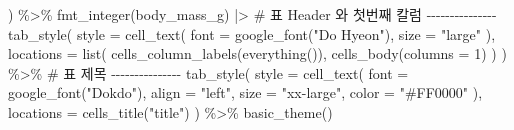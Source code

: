 \documentclass[
  letterpaper,
]{book}
\newenvironment{Shaded}{\begin{snugshade}}{\end{snugshade}}
\newcommand{\AttributeTok}[1]{\textcolor[rgb]{0.40,0.45,0.13}{#1}}
\newcommand{\CommentTok}[1]{\textcolor[rgb]{0.37,0.37,0.37}{#1}}
\newcommand{\DecValTok}[1]{\textcolor[rgb]{0.68,0.00,0.00}{#1}}
\newcommand{\FunctionTok}[1]{\textcolor[rgb]{0.28,0.35,0.67}{#1}}
\newcommand{\NormalTok}[1]{\textcolor[rgb]{0.00,0.23,0.31}{#1}}
\newcommand{\SpecialCharTok}[1]{\textcolor[rgb]{0.37,0.37,0.37}{#1}}
\newcommand{\StringTok}[1]{\textcolor[rgb]{0.13,0.47,0.30}{#1}}
\begin{document}
\begin{Shaded}
\begin{Highlighting}[]
\NormalTok{  ) }\SpecialCharTok{\%\textgreater{}\%} 
  \FunctionTok{fmt\_integer}\NormalTok{(body\_mass\_g) }\SpecialCharTok{|\textgreater{}} 
  \CommentTok{\# 표 Header 와 첫번째 칼럼  {-}{-}{-}{-}{-}{-}{-}{-}{-}{-}{-}{-}{-}{-}{-}}
  \FunctionTok{tab\_style}\NormalTok{(}
    \AttributeTok{style =} \FunctionTok{cell\_text}\NormalTok{(}
      \AttributeTok{font =} \FunctionTok{google\_font}\NormalTok{(}\StringTok{"Do Hyeon"}\NormalTok{), }
      \AttributeTok{size =} \StringTok{"large"}
\NormalTok{    ),}
    \AttributeTok{locations =} \FunctionTok{list}\NormalTok{(}
      \FunctionTok{cells\_column\_labels}\NormalTok{(}\FunctionTok{everything}\NormalTok{()), }
      \FunctionTok{cells\_body}\NormalTok{(}\AttributeTok{columns =} \DecValTok{1}\NormalTok{)}
\NormalTok{    )}
\NormalTok{  ) }\SpecialCharTok{\%\textgreater{}\%}   
  \CommentTok{\# 표 제목 {-}{-}{-}{-}{-}{-}{-}{-}{-}{-}{-}{-}{-}{-}{-}}
  \FunctionTok{tab\_style}\NormalTok{(}
    \AttributeTok{style =} \FunctionTok{cell\_text}\NormalTok{(}
      \AttributeTok{font =} \FunctionTok{google\_font}\NormalTok{(}\StringTok{"Dokdo"}\NormalTok{), }
      \AttributeTok{align =} \StringTok{"left"}\NormalTok{, }
      \AttributeTok{size =} \StringTok{"xx{-}large"}\NormalTok{,}
      \AttributeTok{color =} \StringTok{"\#FF0000"}
\NormalTok{    ),}
    \AttributeTok{locations =} \FunctionTok{cells\_title}\NormalTok{(}\StringTok{"title"}\NormalTok{)}
\NormalTok{  ) }\SpecialCharTok{\%\textgreater{}\%}   
  \FunctionTok{basic\_theme}\NormalTok{() }
\end{Highlighting}
\end{Shaded}
\end{document}
